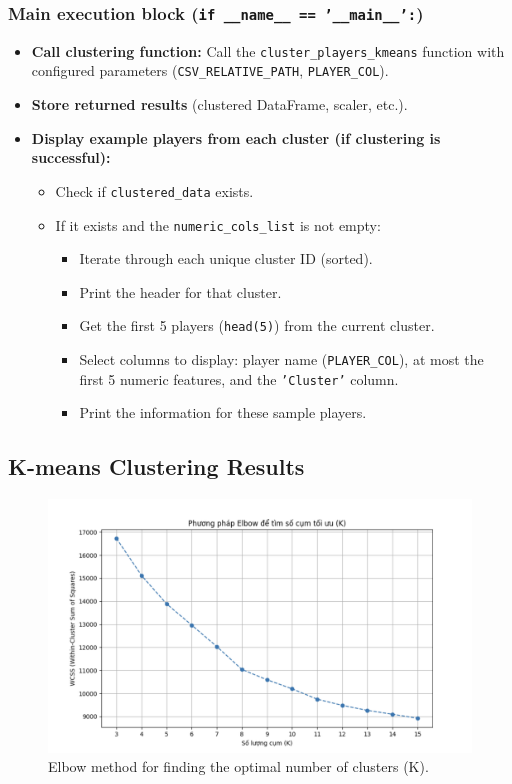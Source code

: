 \documentclass[12pt, a4paper]{report}
\begin{document}
\subsubsection*{Main execution block (\texttt{if \_\_name\_\_ == '\_\_main\_\_':})}
\begin{itemize}
    \item \textbf{Call clustering function:} Call the \texttt{cluster\_players\_kmeans} function with configured parameters (\texttt{CSV\_RELATIVE\_PATH}, \texttt{PLAYER\_COL}).
    \item \textbf{Store returned results} (clustered DataFrame, scaler, etc.).
    \item \textbf{Display example players from each cluster (if clustering is successful):}
    \begin{itemize}
        \item Check if \texttt{clustered\_data} exists.
        \item If it exists and the \texttt{numeric\_cols\_list} is not empty:
        \begin{itemize}
            \item Iterate through each unique cluster ID (sorted).
            \item Print the header for that cluster.
            \item Get the first 5 players (\texttt{head(5)}) from the current cluster.
            \item Select columns to display: player name (\texttt{PLAYER\_COL}), at most the first 5 numeric features, and the \texttt{'Cluster'} column.
            \item Print the information for these sample players.
        \end{itemize}
    \end{itemize}
\end{itemize}

\subsection{K-means Clustering Results}


\begin{figure}[H]
    \centering
    \includegraphics[width=\textwidth]{Elbow.png}
    \caption{Elbow method for finding the optimal number of clusters (K).}
    \label{fig:elbow_method}
\end{figure}
\end{document}
